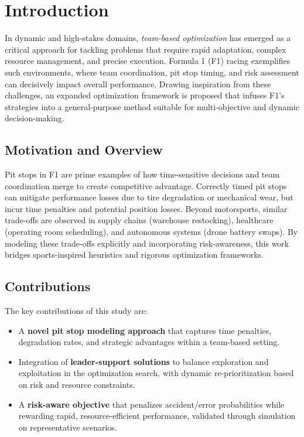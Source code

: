 \documentclass[preprint,12pt]{elsarticle}
\begin{document}
\section{Introduction}
\label{sec:intro}

In dynamic and high-stakes domains, \emph{team-based optimization} has emerged as a critical approach for tackling problems that require rapid adaptation, complex resource management, and precise execution. Formula 1 (F1) racing exemplifies such environments, where team coordination, pit stop timing, and risk assessment can decisively impact overall performance. Drawing inspiration from these challenges, an expanded optimization framework is proposed that infuses F1’s strategies into a general-purpose method suitable for multi-objective and dynamic decision-making.

\subsection{Motivation and Overview}
Pit stops in F1 are prime examples of how time-sensitive decisions and team coordination merge to create competitive advantage. Correctly timed pit stops can mitigate performance losses due to tire degradation or mechanical wear, but incur time penalties and potential position losses. Beyond motorsports, similar trade-offs are observed in supply chains (warehouse restocking), healthcare (operating room scheduling), and autonomous systems (drone battery swaps). By modeling these trade-offs explicitly and incorporating risk-awareness, this work bridges sports-inspired heuristics and rigorous optimization frameworks.

\subsection{Contributions}
The key contributions of this study are:
\begin{itemize}
    \item A \textbf{novel pit stop modeling approach} that captures time penalties, degradation rates, and strategic advantages within a team-based setting.
    \item Integration of \textbf{leader-support solutions} to balance exploration and exploitation in the optimization search, with dynamic re-prioritization based on risk and resource constraints.
    \item A \textbf{risk-aware objective} that penalizes accident/error probabilities while rewarding rapid, resource-efficient performance, validated through simulation on representative scenarios.
\end{itemize}
\end{document}
